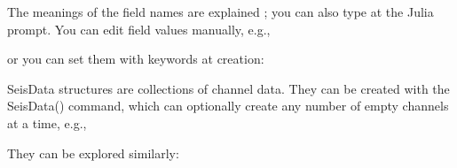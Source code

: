 \documentclass[letterpaper,11pt,english]{sphinxmanual}
\begin{document}
\begin{fulllineitems}
\end{fulllineitems}


The meanings of the field names are explained {\hyperref[\detokenize{src/Appendices/keywords:dkw}]{}}; you can also type
 at the Julia prompt. You can edit field values manually, e.g.,

\begin{sphinxVerbatim}[commandchars=\\\{\}]
  \PYG{p}{[}    \PYG{p}{]}
  
\end{sphinxVerbatim}

or you can set them with keywords at creation:

\begin{sphinxVerbatim}[commandchars=\\\{\}]
  
\end{sphinxVerbatim}

SeisData structures are collections of channel data. They can be created with
the SeisData() command, which can optionally create any number of empty channels
at a time, e.g.,


\begin{fulllineitems}
\end{fulllineitems}


They can be explored similarly:

\begin{sphinxVerbatim}[commandchars=\\\{\}]
\PYG{p}{[}\PYG{p}{]}  
\PYG{p}{[}\PYG{p}{]}  \PYG{p}{[}    \PYG{p}{]}
\end{sphinxVerbatim}
\end{document}
